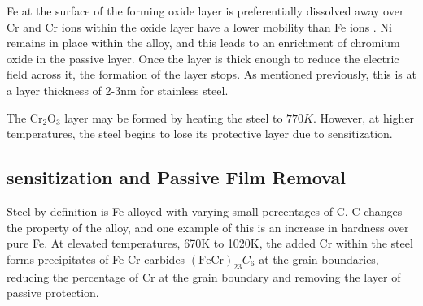 Fe at the surface of the forming oxide layer is preferentially dissolved away over Cr \cite{kirchheimcc} and Cr ions within the oxide layer have a lower mobility than Fe ions \cite{kirchheimpassive}.  Ni remains in place within the alloy, and this leads to an enrichment of chromium oxide in the passive layer.  Once the layer is thick enough to reduce the electric field across it, the formation of the layer stops.  As mentioned previously, this is at a layer thickness of 2-3nm for stainless steel.

The $\text{Cr}_{2}\text{O}_{3}$ layer may be formed by heating the steel to $770K$\cite{propaustenitic}.  However, at higher temperatures, the steel begins to lose its protective layer due to \gls{sensitization}.


\subsection{\Gls{sensitization} and Passive Film Removal}

Steel by definition is Fe alloyed with varying small percentages of C.  C changes the property of the alloy, and one example of this is an increase in hardness over pure Fe.  At elevated temperatures, 670K to 1020K, the added Cr within the steel forms precipitates of Fe-Cr carbides $(\text{Fe}\text{Cr})_{23} C_{6}$ at the grain boundaries, reducing the percentage of Cr at the grain boundary and removing the layer of passive protection.

